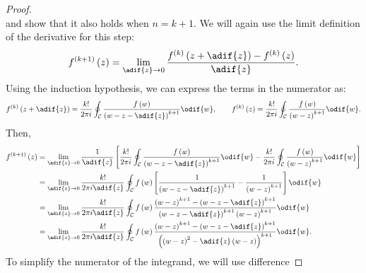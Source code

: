 \documentclass{article}
\begin{document}
\begin{proof}
\begin{equation*}
    \end{equation*}
    and show that it also holds when \(n = k + 1\).
    We will again use the limit definition of the derivative for this
    step:
    \begin{equation*}
        f^{\left( k + 1 \right)}\left( z \right) = \lim_{\adif{z} \to 0} \frac{f^{\left( k \right)}\left( z + \adif{z} \right) - f^{\left( k \right)}\left( z \right)}{\adif{z}}.
    \end{equation*}
    Using the induction hypothesis, we can express the terms in the
    numerator as:
    \begin{equation*}
        f^{\left( k \right)}\left( z + \adif{z} \right) = \frac{k!}{2 \pi i} \oint_{\mathcal{C}} \frac{f\left( w \right)}{\left( w - z - \adif{z} \right)^{k + 1}} \odif{w}, \qquad f^{\left( k \right)}\left( z \right) = \frac{k!}{2 \pi i} \oint_{\mathcal{C}} \frac{f\left( w \right)}{\left( w - z \right)^{k + 1}} \odif{w}.
    \end{equation*}
    Then,
    \begin{align*}
        f^{\left( k + 1 \right)}\left( z \right) & = \lim_{\adif{z} \to 0} \frac{1}{\adif{z}} \left[ \frac{k!}{2 \pi i} \oint_{\mathcal{C}} \frac{f\left( w \right)}{\left( w - z - \adif{z} \right)^{k + 1}} \odif{w} - \frac{k!}{2 \pi i} \oint_{\mathcal{C}} \frac{f\left( w \right)}{\left( w - z \right)^{k + 1}} \odif{w} \right] \\
                                                 & = \lim_{\adif{z} \to 0} \frac{k!}{2 \pi i \adif{z}} \oint_{\mathcal{C}} f\left( w \right) \left[ \frac{1}{\left( w - z - \adif{z} \right)^{k + 1}} - \frac{1}{\left( w - z \right)^{k + 1}} \right] \odif{w}                                                                         \\
                                                 & = \lim_{\adif{z} \to 0} \frac{k!}{2 \pi i \adif{z}} \oint_{\mathcal{C}} f\left( w \right) \frac{\left( w - z \right)^{k + 1} - \left( w - z - \adif{z} \right)^{k + 1}}{\left( w - z - \adif{z} \right)^{k + 1} \left( w - z \right)^{k + 1}} \odif{w}                               \\
                                                 & = \lim_{\adif{z} \to 0} \frac{k!}{2 \pi i \adif{z}} \oint_{\mathcal{C}} f\left( w \right) \frac{\left( w - z \right)^{k + 1} - \left( w - z - \adif{z} \right)^{k + 1}}{\left( \left( w - z \right)^2 - \adif{z} \left( w - z \right) \right)^{k + 1}} \odif{w}.
    \end{align*}
    To simplify the numerator of the integrand, we will use difference

\end{proof}
\end{document}
